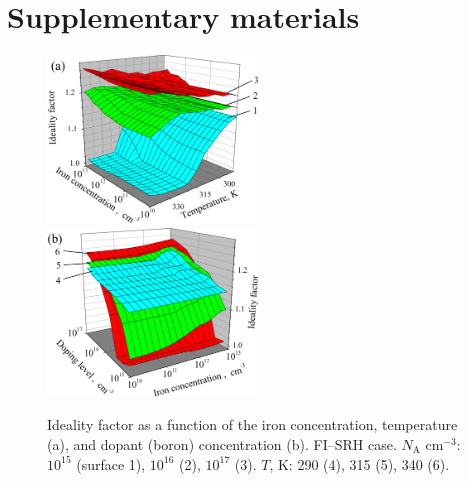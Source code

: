 \documentclass [sort&compress] {elsarticle}
\begin{document}
\section*{Supplementary materials}


\begin{figure}[!h]
\includegraphics[width=0.5\textwidth]{FigS1a}%
\includegraphics[width=0.5\textwidth]{FigS1b}
\caption{\label{figS1}
Ideality factor as a function of the iron concentration, temperature (a), and dopant (boron) concentration (b).
FI--SRH case.
$N_\mathrm{A}$ cm$^{-3}$: $10^{15}$ (surface 1), $10^{16}$ (2), $10^{17}$ (3).
$T$, K: 290 (4), 315 (5), 340 (6).
}%
\end{figure}
\end{document}
